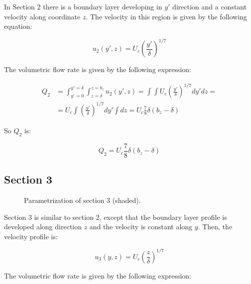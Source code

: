 In Section 2 there is a boundary layer developing in $y'$ direction and a constant velocity along coordinate $z$. The velocity in this region is given by the following equation:

\begin{equation}
\label{eq:3DBL_profile_u2}
\boxed{
u_2 \left( y', z \right) = U_c \left( \frac{y'}{\delta} \right)^{1/7}
}
\end{equation}

The volumetric flow rate is given by the following expression:
 
\begin{equation}
\begin{split}
Q_2 &= \int_{y'=0}^{y'=\delta} \int_{z=\delta}^{z=b_z} u_2 \left( y', z  \right) = \int \int U_c \left( \frac{y'}{\delta} \right)^{1/7} dy' dz  = \\
&= U_c \int \left( \frac{y'}{\delta} \right)^{1/7} dy' \int dz = U_c \frac{7}{8} \delta \left( b_z - \delta \right)
\end{split}
\end{equation}

So $Q_2$ is:

\begin{equation}
\label{eq:3DBL_Q2}
\boxed{
Q_2 = U_c \frac{7}{8} \delta \left( b_z - \delta \right)
}
\end{equation}


\subsection*{Section 3}

\begin{figure}[h!]	
	\centering
%	
	\caption{Parametrization of section 3 (shaded).}
	\label{fig:param_S3}
\end{figure}

Section 3 is similar to section 2, except that the boundary layer profile is developed along direction $z$ and the velocity is constant along $y$. Then, the velocity profile is:

\begin{equation}
\label{eq:3DBL_profile_u3}
\boxed{
u_3 \left( y, z \right) = U_c \left( \frac{z}{\delta} \right)^{1/7}
}
\end{equation}

The volumetric flow rate is given by the following expression:
 
